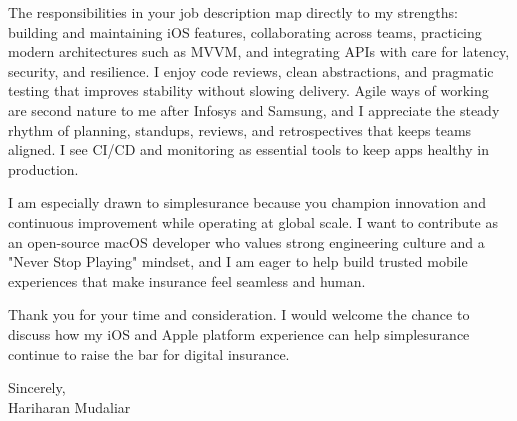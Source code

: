 \documentclass[letterpaper,11pt]{article}
\begin{document}
\vspace{6pt}

\noindent The responsibilities in your job description map directly to my strengths: building and maintaining iOS features, collaborating across teams, practicing modern architectures such as MVVM, and integrating APIs with care for latency, security, and resilience. I enjoy code reviews, clean abstractions, and pragmatic testing that improves stability without slowing delivery. Agile ways of working are second nature to me after Infosys and Samsung, and I appreciate the steady rhythm of planning, standups, reviews, and retrospectives that keeps teams aligned. I see CI/CD and monitoring as essential tools to keep apps healthy in production.

\vspace{6pt}

\noindent I am especially drawn to simplesurance because you champion innovation and continuous improvement while operating at global scale. I want to contribute as an open-source macOS developer who values strong engineering culture and a "Never Stop Playing" mindset, and I am eager to help build trusted mobile experiences that make insurance feel seamless and human.

\vspace{10pt}

\noindent Thank you for your time and consideration. I would welcome the chance to discuss how my iOS and Apple platform experience can help simplesurance continue to raise the bar for digital insurance.

\vspace{10pt}

\noindent Sincerely, \\
\noindent Hariharan Mudaliar
\end{document}
